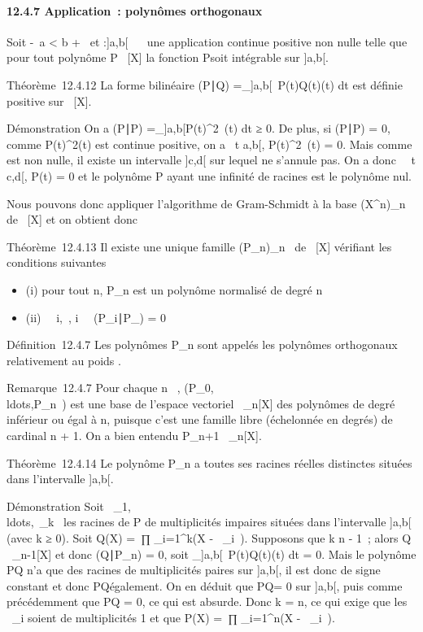 \documentclass[]{article}
\begin{document}
\paragraph{12.4.7 Application~: polynômes orthogonaux}

Soit -\infty~\leq a \textless{} b \leq +\infty~ et \omega :{]}a,b{[}\rightarrow~ ~ une application
continue positive non nulle telle que pour tout polynôme P \in {}~{[}X{]} la
fonction P\omega soit intégrable sur {]}a,b{[}.

Théorème~12.4.12 La forme bilinéaire (P∣Q)
=\int  \_{]}a,b{[}~P(t)Q(t)\omega(t) dt est
définie positive sur ~{[}X{]}.

Démonstration On a (P∣P)
=\int  \_{]}a,b{[}P(t)^2~\omega(t)
dt ≥ 0. De plus, si (P∣P) = 0, comme
P(t)^2\omega(t) est continue positive, on a
\forall~t \in{]}a,b{[}, P(t)^2~\omega(t) = 0. Mais
comme \omega est non nulle, il existe un intervalle {]}c,d{[} sur lequel \omega ne
s'annule pas. On a donc \forall~~t \in{]}c,d{[}, P(t) =
0 et le polynôme P ayant une infinité de racines est le polynôme nul.

Nous pouvons donc appliquer l'algorithme de Gram-Schmidt à la base
(X^n)\_n\in{}~ de ~{[}X{]} et on obtient donc

Théorème~12.4.13 Il existe une unique famille
(P\_n)\_n\in{}~ de ~{[}X{]} vérifiant les conditions
suivantes

\begin{itemize}
\itemsep1pt\parskip0pt
\item
  (i) pour tout n, P\_n est un polynôme normalisé de degré n
\item
  (ii) \forall~~i,\jmath \in {}~,
  i\neq~\jmath \rigtharrow~
  (P\_i∣P\_\jmath) = 0
\end{itemize}

Définition~12.4.7 Les polynômes P\_n sont appelés les polynômes
orthogonaux relativement au poids \omega.

Remarque~12.4.7 Pour chaque n \in {}~,
(P\_0,\\ldots,P\_n~)
est une base de l'espace vectoriel ~\_n{[}X{]} des polynômes de
degré inférieur ou égal à n, puisque c'est une famille libre (échelonnée
en degrés) de cardinal n + 1. On a bien entendu P\_n+1 \bot
{}~\_n{[}X{]}.

Théorème~12.4.14 Le polynôme P\_n a toutes ses racines réelles
distinctes situées dans l'intervalle {]}a,b{[}.

Démonstration Soit
\alpha~\_1,\\ldots,\alpha~\_k~
les racines de P de multiplicités impaires situées dans l'intervalle
{]}a,b{[} (avec k ≥ 0). Soit Q(X) =\
∏  \_i=1^k(X - \alpha~\_i~).
Supposons que k \leq n - 1~; alors Q \in {}~\_n-1{[}X{]} et donc
(Q∣P\_n) = 0, soit
\int  \_{]}a,b{[}~P(t)Q(t)\omega(t) dt = 0.
Mais le polynôme PQ n'a que des racines de multiplicités paires sur
{]}a,b{[}, il est donc de signe constant et donc PQ\omega également. On en
déduit que PQ\omega = 0 sur {]}a,b{[}, puis comme précédemment que PQ = 0, ce
qui est absurde. Donc k = n, ce qui exige que les \alpha~\_i soient de
multiplicités 1 et que P(X) =\
∏  \_i=1^n(X - \alpha~\_i~).
\end{document}
